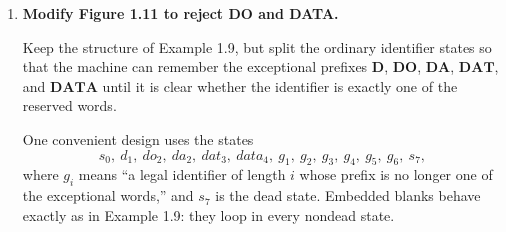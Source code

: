 \documentclass[11pt,openany]{book}
\begin{document}
\begin{enumerate}[{1.}1.]
\begin{center}
\end{center}

\item \textbf{Modify Figure 1.11 to reject DO and DATA.}

Keep the structure of Example 1.9, but split the ordinary identifier states so that the machine can remember the exceptional prefixes $\pmb{D}$, $\pmb{DO}$, $\pmb{DA}$, $\pmb{DAT}$, and $\pmb{DATA}$ until it is clear whether the identifier is exactly one of the reserved words.

One convenient design uses the states
\[
s_0,\ d_1,\ do_2,\ da_2,\ dat_3,\ data_4,\ g_1,\ g_2,\ g_3,\ g_4,\ g_5,\ g_6,\ s_7,
\]
where $g_i$ means ``a legal identifier of length $i$ whose prefix is no longer one of the exceptional words,'' and $s_7$ is the dead state. Embedded blanks behave exactly as in Example 1.9: they loop in every nondead state.


\end{enumerate}
\end{document}
